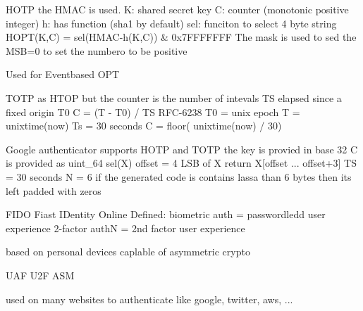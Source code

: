 \documentclass[12pt]{article}
\begin{document}
HOTP
the HMAC is used.
K: shared secret key
C: counter (monotonic positive integer)
h: has function (sha1 by default)
sel: funciton to select 4 byte string
HOPT(K,C) = sel(HMAC-h(K,C)) \& 0x7FFFFFFF
The mask is used to sed the MSB=0 to set the numbero to be positive

Used for Eventbased OPT



TOTP
as HTOP but the counter is the number of intevals TS elapsed since a fixed origin T0
C = (T - T0) / TS
RFC-6238
T0 = unix epoch
T = unixtime(now)
Ts = 30 seconds
C = floor( unixtime(now) / 30)


Google authenticator
supports HOTP and TOTP
the key is provied in base 32
C is provided as uint\_64
sel(X)
offset = 4 LSB of X
return X[offset ... offset+3]
TS = 30 seconds
N = 6
if the generated code is contains lassa than 6 bytes then its left padded with zeros



FIDO
Fiast IDentity Online
Defined:
biometric auth = passwordledd user experience
2-factor authN = 2nd factor user experience

based on personal devices caplable of asymmetric crypto

UAF
U2F
ASM



used on many websites to authenticate like google, twitter, aws, ...
\end{document}
